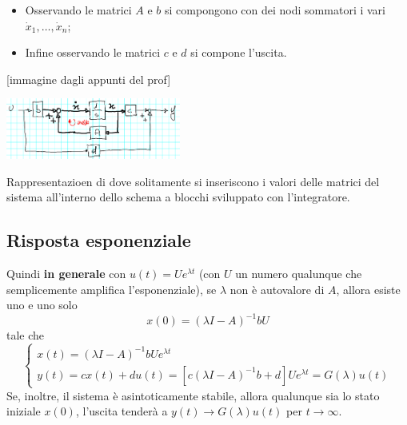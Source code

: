 \begin{landscape}
\begin{itemize}
        \item Osservando le matrici $A$ e $b$ si compongono con dei nodi sommatori i vari $\dot{x}_1, \dots, \dot{x}_n$;
        \item Infine osservando le matrici $c$ e $d$ si compone l'uscita.
    \end{itemize}
    [immagine dagli appunti del prof]
    \begin{center}
        \includegraphics[height=2cm]{../lezione8/img1.PNG}
    \end{center}
    Rappresentazioen di dove solitamente si inseriscono i valori delle matrici del sistema all'interno dello schema a blocchi sviluppato con l'integratore.
    \subsection*{Risposta esponenziale}
    Quindi \textbf{in generale} con $u(t) = U e^{\lambda t}$ (con $U$ un numero qualunque che semplicemente amplifica l'esponenziale), se $\lambda$ non è autovalore di $A$, allora esiste uno e uno solo 
    \[
        x(0) = (\lambda I - A)^{-1}b U
    \] tale che 
    \[
        \begin{cases}
            x(t) = (\lambda I -A)^{-1} b U e^{\lambda t}\\
            y(t) = cx(t) + du(t) =  [c(\lambda I -A)^{-1} b + d] U e^{\lambda t} = G(\lambda) u(t)
        \end{cases}
    \]
    Se, inoltre, il sistema è asintoticamente stabile, allora qualunque sia lo stato iniziale $x(0)$, l'uscita tenderà a $y(t) \rightarrow G(\lambda) u(t)$ per $t \rightarrow  \infty$.

\end{landscape}
